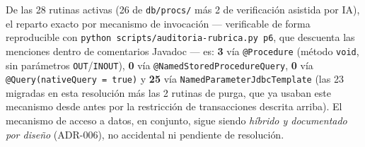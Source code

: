 De las 28 rutinas activas (26 de \texttt{db/procs/} más 2 de verificación asistida por IA), el
reparto exacto por mecanismo de invocación --- verificable de forma reproducible con
\texttt{python scripts/auditoria-rubrica.py p6}, que descuenta las menciones dentro de comentarios
Javadoc --- es: \textbf{3} vía \texttt{@Procedure} (método \texttt{void}, sin parámetros
\texttt{OUT}/\texttt{INOUT}), \textbf{0} vía \texttt{@NamedStoredProcedureQuery}, \textbf{0} vía
\texttt{@Query(nativeQuery = true)} y \textbf{25} vía \texttt{NamedParameterJdbcTemplate} (las 23
migradas en esta resolución más las 2 rutinas de purga, que ya usaban este mecanismo desde antes por
la restricción de transacciones descrita arriba). El mecanismo de acceso a datos, en conjunto, sigue
siendo \emph{híbrido y documentado por diseño} (ADR-006), no accidental ni pendiente de resolución.
